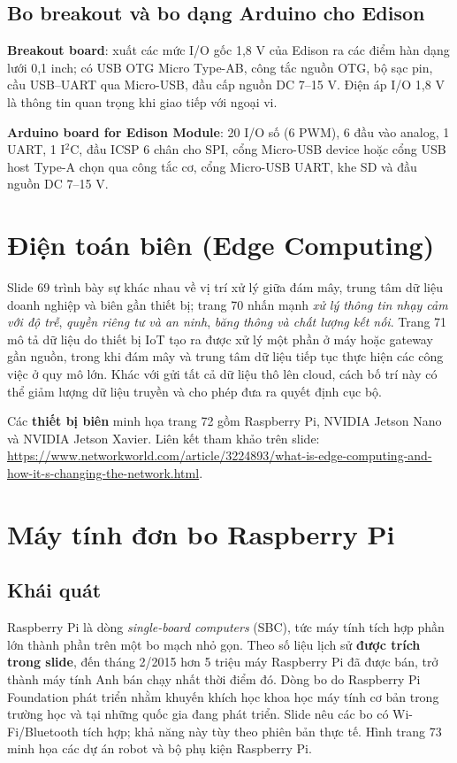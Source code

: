 \subsection{Bo breakout và bo dạng Arduino cho Edison}
\textbf{Breakout board}: xuất các mức I/O gốc 1,8 V của Edison ra các điểm hàn dạng lưới 0,1 inch; có USB OTG Micro Type-AB, công tắc nguồn OTG, bộ sạc pin, cầu USB--UART qua Micro-USB, đầu cấp nguồn DC 7--15 V. Điện áp I/O 1,8 V là thông tin quan trọng khi giao tiếp với ngoại vi.

\textbf{Arduino board for Edison Module}: 20 I/O số (6 PWM), 6 đầu vào analog, 1 UART, 1 I\(^{2}\)C, đầu ICSP 6 chân cho SPI, cổng Micro-USB device hoặc cổng USB host Type-A chọn qua công tắc cơ, cổng Micro-USB UART, khe SD và đầu nguồn DC 7--15 V.
\section{Điện toán biên (Edge Computing)}
Slide 69 trình bày sự khác nhau về vị trí xử lý giữa đám mây, trung tâm dữ liệu doanh nghiệp và biên gần thiết bị; trang 70 nhấn mạnh \emph{xử lý thông tin nhạy cảm với độ trễ}, \emph{quyền riêng tư và an ninh}, \emph{băng thông và chất lượng kết nối}. Trang 71 mô tả dữ liệu do thiết bị IoT tạo ra được xử lý một phần ở máy hoặc gateway gần nguồn, trong khi đám mây và trung tâm dữ liệu tiếp tục thực hiện các công việc ở quy mô lớn. Khác với gửi tất cả dữ liệu thô lên cloud, cách bố trí này có thể giảm lượng dữ liệu truyền và cho phép đưa ra quyết định cục bộ.

Các \textbf{thiết bị biên} minh họa trang 72 gồm Raspberry Pi, NVIDIA Jetson Nano và NVIDIA Jetson Xavier. Liên kết tham khảo trên slide: \url{https://www.networkworld.com/article/3224893/what-is-edge-computing-and-how-it-s-changing-the-network.html}.
\section{Máy tính đơn bo Raspberry Pi}
\subsection{Khái quát}
Raspberry Pi là dòng \emph{single-board computers} (SBC), tức máy tính tích hợp phần lớn thành phần trên một bo mạch nhỏ gọn. Theo số liệu lịch sử \textbf{được trích trong slide}, đến tháng 2/2015 hơn 5 triệu máy Raspberry Pi đã được bán, trở thành máy tính Anh bán chạy nhất thời điểm đó. Dòng bo do Raspberry Pi Foundation phát triển nhằm khuyến khích học khoa học máy tính cơ bản trong trường học và tại những quốc gia đang phát triển. Slide nêu các bo có Wi-Fi/Bluetooth tích hợp; khả năng này tùy theo phiên bản thực tế. Hình trang 73 minh họa các dự án robot và bộ phụ kiện Raspberry Pi.
